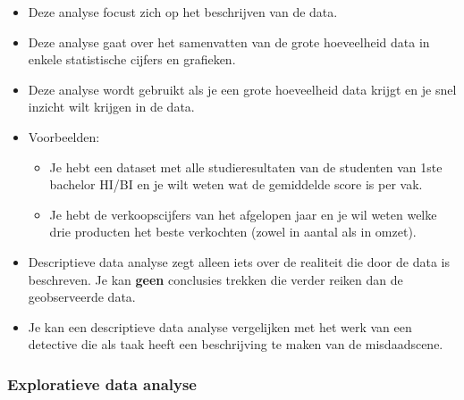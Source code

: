\documentclass[]{tufte-book}
\providecommand{\tightlist}{%
  \setlength{\itemsep}{0pt}\setlength{\parskip}{0pt}}
\begin{document}
\begin{itemize}
\tightlist
\item
  Deze analyse focust zich op het beschrijven van de data.
\item
  Deze analyse gaat over het samenvatten van de grote hoeveelheid data in enkele statistische cijfers en grafieken.
\item
  Deze analyse wordt gebruikt als je een grote hoeveelheid data krijgt en je snel inzicht wilt krijgen in de data.
\item
  Voorbeelden:

  \begin{itemize}
  \tightlist
  \item
    Je hebt een dataset met alle studieresultaten van de studenten van 1ste bachelor HI/BI en je wilt weten wat de gemiddelde score is per vak.
  \item
    Je hebt de verkoopscijfers van het afgelopen jaar en je wil weten welke drie producten het beste verkochten (zowel in aantal als in omzet).
  \end{itemize}
\item
  Descriptieve data analyse zegt alleen iets over de realiteit die door de data is beschreven. Je kan \textbf{geen} conclusies trekken die verder reiken dan de geobserveerde data.
\item
  Je kan een descriptieve data analyse vergelijken met het werk van een detective die als taak heeft een beschrijving te maken van de misdaadscene.
\end{itemize}

\hypertarget{exploratieve-data-analyse}{%
\subsubsection*{Exploratieve data analyse}\label{exploratieve-data-analyse}}
\end{document}

